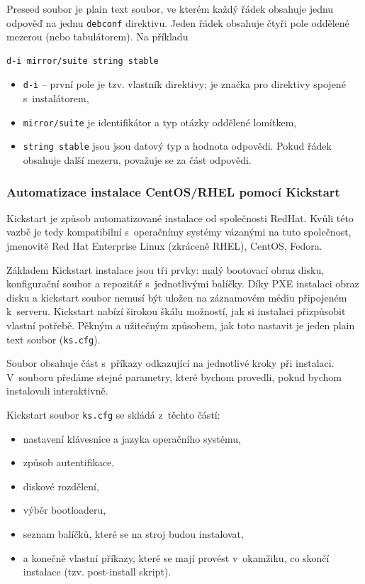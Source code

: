 Preseed soubor je plain text soubor, ve kterém každý řádek obsahuje jednu odpověď na jednu \texttt{debconf} direktivu. Jeden řádek obsahuje čtyři pole oddělené mezerou (nebo tabulátorem). Na příkladu
\begin{verbatim}
d-i mirror/suite string stable
\end{verbatim}
\begin{itemize}

\item \texttt{d-i} -- první pole je tzv. vlastník direktivy;  je značka pro direktivy spojené s~instalátorem,
\item \texttt{mirror/suite} je identifikátor a typ otázky oddělené lomítkem,
\item \texttt{string stable} jsou jsou datový typ a hodnota odpovědi. Pokud řádek obsahuje další mezeru, považuje se za část odpovědi.
\end{itemize}




\subsubsection{Automatizace instalace CentOS/RHEL pomocí Kickstart}

\label{kickstart}
Kickstart je způsob automatizované instalace od společnosti RedHat. Kvůli této vazbě je tedy kompatibilní s~operačnímy systémy vázanými na tuto společnost, jmenovitě Red Hat Enterprise Linux (zkráceně RHEL), CentOS, Fedora.

Základem Kickstart instalace jsou tři prvky: malý bootovací obraz disku, konfigurační soubor a repozitář s~jednotlivými balíčky. Díky PXE instalaci obraz disku a kickstart soubor nemusí být  uložen na záznamovém médiu připojeném k~serveru. Kickstart nabízí širokou škálu možností, jak si instalaci přizpůsobit vlastní potřebě. Pěkným a užitečným způsobem, jak toto nastavit je jeden plain text soubor (\texttt{ks.cfg}).

Soubor obsahuje část s~příkazy odkazující na jednotlivé kroky při instalaci. V~souboru předáme stejné parametry, které bychom provedli, pokud bychom instalovali interaktivně.

Kickstart soubor \texttt{ks.cfg} se skládá z~těchto částí:

\begin{itemize}

\item nastavení klávesnice a jazyka operačního systému,
\item způsob autentifikace,
\item diskové rozdělení,
\item výběr bootloaderu,
\item seznam balíčků, které se na stroj budou instalovat,
\item a konečně vlastní příkazy, které se mají provést v~okamžiku, co skončí instalace (tzv. post-install skript).
\end{itemize}

